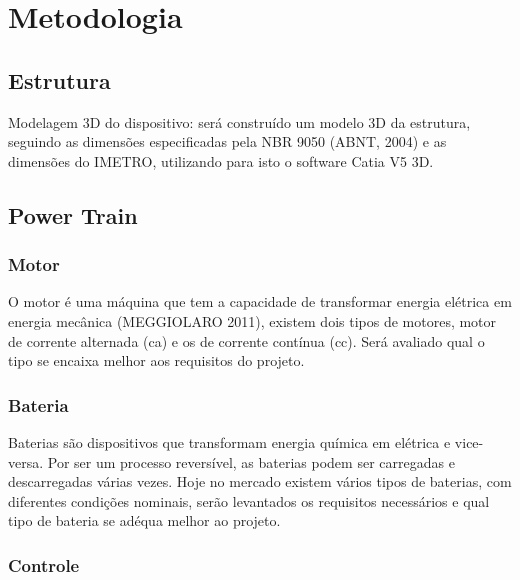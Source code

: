 \chapter[Metodologia]{Metodologia}

\section{Estrutura}
Modelagem 3D do dispositivo: será construído um modelo 3D da estrutura, seguindo as dimensões especificadas pela NBR 9050 (ABNT, 2004) e as dimensões do IMETRO, utilizando para isto o software Catia V5 3D.

\section{Power Train}

\subsection{Motor}
O motor é uma máquina que tem a capacidade de transformar energia elétrica em energia mecânica (MEGGIOLARO 2011), existem dois tipos de motores, motor de corrente alternada (ca) e os de corrente contínua (cc). Será avaliado qual o tipo se encaixa melhor aos requisitos do projeto.

\subsection{Bateria}
Baterias são dispositivos que transformam energia química em elétrica e vice-versa. Por ser um processo reversível, as baterias podem ser carregadas e descarregadas várias vezes. Hoje no mercado existem vários tipos de baterias, com diferentes condições nominais, serão levantados os requisitos necessários e qual tipo de bateria se adéqua melhor ao projeto.

\subsection{Controle}
